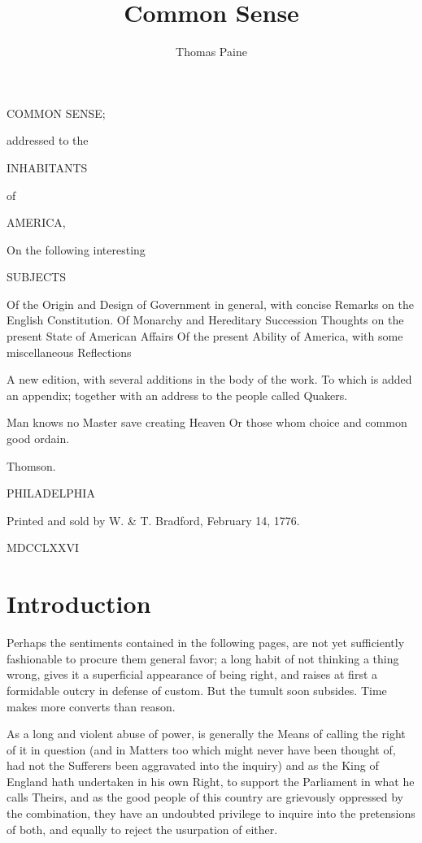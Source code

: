 \documentclass[12pt,oneside]{memoir}
\begin{document}
\title{Common Sense}
\author{Thomas Paine}
\frontmatter

COMMON SENSE;

addressed to the

INHABITANTS

of

AMERICA,

On the following interesting

SUBJECTS

    Of the Origin and Design of Government in general,
    with concise Remarks on the English Constitution.
    Of Monarchy and Hereditary Succession
    Thoughts on the present State of American Affairs
    Of the present Ability of America, with some
    miscellaneous Reflections

A new edition, with several additions in the body of the work. To
which is added an appendix; together with an address to the people
called Quakers.

Man knows no Master save creating Heaven
Or those whom choice and common good ordain.

Thomson.

PHILADELPHIA

Printed and sold by W. \& T. Bradford, February 14, 1776.

MDCCLXXVI

\newpage

\section*{Introduction}

Perhaps the sentiments contained in the following pages, are not yet
sufficiently fashionable to procure them general favor; a long habit
of not thinking a thing wrong, gives it a superficial appearance of
being right, and raises at first a formidable outcry in defense of
custom. But the tumult soon subsides. Time makes more converts than
reason.

As a long and violent abuse of power, is generally the Means of
calling the right of it in question (and in Matters too which might
never have been thought of, had not the Sufferers been aggravated
into the inquiry) and as the King of England hath undertaken in his
own Right, to support the Parliament in what he calls Theirs, and as
the good people of this country are grievously oppressed by the
combination, they have an undoubted privilege to inquire into the
pretensions of both, and equally to reject the usurpation of either.
\end{document}
